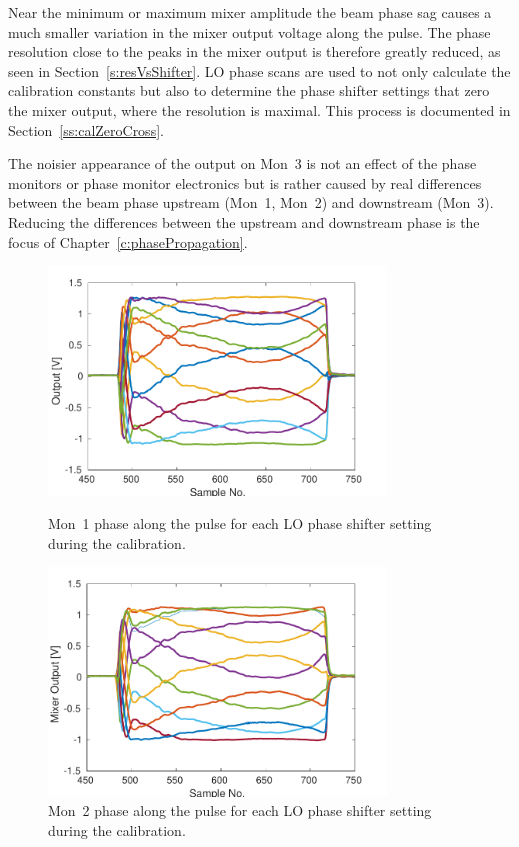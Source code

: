 Near the minimum or maximum mixer amplitude the beam phase sag causes a much smaller variation in the mixer output voltage along the pulse. The phase resolution close to the peaks in the mixer output is therefore greatly reduced, as seen in Section~\ref{s:resVsShifter}. LO phase scans are used to not only calculate the calibration constants but also to determine the phase shifter settings that zero the mixer output, where the resolution is maximal. This process is documented in Section~\ref{ss:calZeroCross}.

The noisier appearance of the output on Mon~3 is not an effect of the phase monitors or phase monitor electronics but is rather caused by real differences between the beam phase upstream (Mon~1, Mon~2) and downstream (Mon~3). Reducing the differences between the upstream and downstream phase is the focus of Chapter~\ref{c:phasePropagation}.

\begin{figure}
  \centering
  \includegraphics[width=0.8\textwidth]{Figures/phaseMons/mon1AllPoints}
  \caption{Mon~1 phase along the pulse for each LO phase shifter setting during the calibration.}
  \label{f:mon1AllPoints}
 \includegraphics[width=0.8\textwidth]{Figures/phaseMons/mon2AllPoints}
  \caption{Mon~2 phase along the pulse for each LO phase shifter setting during the calibration.}
  \label{f:mon2AllPoints}
\end{figure}

